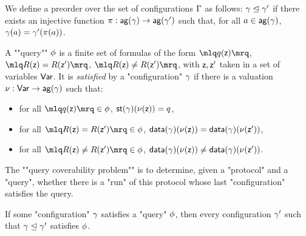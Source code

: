\begin{definition}
We define a preorder over the set of configurations $\Gamma$ as follows: $\gamma \trianglelefteq \gamma'$ if there exists an injective function $\pi: \mathsf{ag}(\gamma) \rightarrow \mathsf{ag}(\gamma')$ such that, for all $a \in \mathsf{ag}(\gamma)$, $\gamma(a) = \gamma'(\pi(a))$. 
\end{definition}

\begin{definition}
	A ""query"" $\phi$ is a finite set of formulas of the form $\quotemarks{q(\var{z})}$, $\quotemarks{R(\var{z}) = R(\var{z}')}$, $\quotemarks{R(\var{z}) \neq R(\var{z}')}$, with $\mathsf{z}, \mathsf{z}'$ taken in a set of variables $\mathsf{Var}$.
	It is \emph{satisfied} by a "configuration" $\gamma$ if there is a valuation $\nu : \mathsf{Var} \to \mathsf{ag}(\gamma)$ such that:
	\begin{itemize}
		\item for all $\quotemarks{q(\var{z})} \in \query$, $\mathsf{st}(\gamma)(\nu(\mathsf{z})) = q$,
		
		\item for all $\quotemarks{R(\var{z}) = R(\var{z'})} \in \query$, $\mathsf{data}(\gamma)(\nu(\mathsf{z})) = \mathsf{data}(\gamma)(\nu(\mathsf{z'}))$,
		
		\item for all $\quotemarks{R(\var{z}) \neq R(\var{z'})} \in \query$, $\mathsf{data}(\gamma)(\nu(\mathsf{z})) \neq \mathsf{data}(\gamma)(\nu(\mathsf{z'}))$.
	\end{itemize}

	\AP The ""query coverability problem"" is to determine, given a "protocol" and a "query", whether there is a "run" of this protocol whose last "configuration" satisfies the query.
\end{definition}

\begin{remark}
\label{rem:bigger_config_query}
If some "configuration" $\gamma$ satisfies a "query" $\phi$, then every configuration $\gamma'$ such that $\gamma \trianglelefteq \gamma'$ satisfies $\phi$. 
\end{remark}

